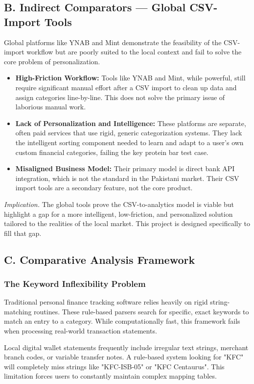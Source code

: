 \subsection{B. Indirect Comparators — Global CSV-Import Tools}
Global platforms like YNAB and Mint demonstrate the feasibility of the CSV-import workflow but are poorly suited to the local context and fail to solve the core problem of personalization.
\begin{itemize}
	\item \textbf{High-Friction Workflow:} Tools like YNAB and Mint, while powerful, still require significant manual effort after a CSV import to clean up data and assign categories line-by-line. This does not solve the primary issue of laborious manual work.
	\item \textbf{Lack of Personalization and Intelligence:} These platforms are separate, often paid services that use rigid, generic categorization systems. They lack the intelligent sorting component needed to learn and adapt to a user's own custom financial categories, failing the key protein bar test case.
	\item \textbf{Misaligned Business Model:} Their primary model is direct bank API integration, which is not the standard in the Pakistani market. Their CSV import tools are a secondary feature, not the core product.
\end{itemize}
\textit{Implication.} The global tools prove the CSV-to-analytics model is viable but highlight a gap for a more intelligent, low-friction, and personalized solution tailored to the realities of the local market. This project is designed specifically to fill that gap.

\subsection{C. Comparative Analysis Framework}

\subsubsection{The Keyword Inflexibility Problem}
Traditional personal finance tracking software relies heavily on rigid string-matching routines. These rule-based parsers search for specific, exact keywords to match an entry to a category. While computationally fast, this framework fails when processing real-world transaction statements.

Local digital wallet statements frequently include irregular text strings, merchant branch codes, or variable transfer notes. A rule-based system looking for "KFC" will completely miss strings like "KFC-ISB-05" or "KFC Centaurus". This limitation forces users to constantly maintain complex mapping tables.

